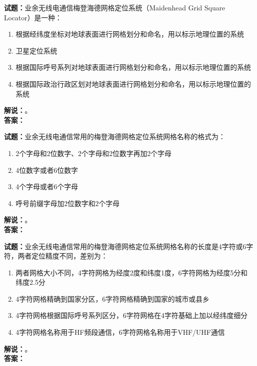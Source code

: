 \documentclass{ctexbook}
\begin{document}
\vspace{\baselineskip}

\noindent\textbf{试题：}业余无线电通信梅登海德网格定位系统（Maidenhead Grid Square Locator）是一种：
\begin{enumerate}[leftmargin=3em]
  \item 根据经纬度坐标对地球表面进行网格划分和命名，用以标示地理位置的系统
  \item 卫星定位系统
  \item 根据国际呼号系列对地球表面进行网格划分和命名，用以标示地理位置的系统
  \item 根据国际政治行政区划对地球表面进行网格划分和命名，用以标示地理位置的系统
\end{enumerate}
\noindent\textbf{解说：}\textbf{}。\\\noindent\textbf{答案：}

\vspace{\baselineskip}

\noindent\textbf{试题：}业余无线电通信常用的梅登海德网格定位系统网格名称的格式为：
\begin{enumerate}[leftmargin=3em]
  \item 2个字母和2位数字、2个字母和2位数字再加2个字母
  \item 4位数字或者6位数字
  \item 4个字母或者6个字母
  \item 呼号前缀字母加2位数字和2个字母
\end{enumerate}
\noindent\textbf{解说：}\textbf{}。\\\noindent\textbf{答案：}

\vspace{\baselineskip}

\noindent\textbf{试题：}业余无线电通信常用的梅登海德网格定位系统网格名称的长度是4字符或6字符，两者定位精度不同，差别为：
\begin{enumerate}[leftmargin=3em]
  \item 两者网格大小不同，4字符网格为经度2度和纬度1度，6字符网格为经度5分和纬度2.5分
  \item 4字符网格精确到国家分区，6字符网格精确到国家的城市或县乡
  \item 4字符网格根据国际呼号系列区分，6字符网格在4字符基础上加以经纬度细分
  \item 4字符网格名称用于HF频段通信，6字符网格名称用于VHF/UHF通信
\end{enumerate}
\noindent\textbf{解说：}\textbf{}。\\\noindent\textbf{答案：}
\end{document}

